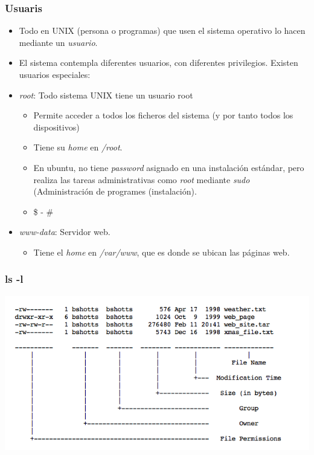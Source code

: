 \documentclass[colorlinks,10pt]{beamer}
\begin{document}
\begin{frame}
  \frametitle{Usuaris}
  \begin{itemize}
  \item<+-> Todo en UNIX (persona o programas) que usen el sistema operativo lo hacen mediante un \emph{usuario}.
  \item<+-> El sistema contempla diferentes usuarios, con diferentes privilegios. Existen usuarios especiales:
  \item<+-> \emph{root}: Todo  sistema UNIX tiene un usuario root
    \begin{itemize}
    \item Permite acceder a todos los ficheros del sistema (y por tanto todos los dispositivos)
    \item Tiene su \emph{home} en \emph{/root}.
    \item En ubuntu, no tiene \emph{password} asignado en una instalación estándar, pero realiza las tareas administrativas como 
      \emph{root} mediante \emph{sudo} (Administración de programes (instalación).
    \item \$ - \#
    \end{itemize}
\item<+-> \emph{www-data}: Servidor 
  web.
  \begin{itemize}
  \item Tiene el  \emph{home} en  \emph{/var/www}, que es donde se ubican las páginas web.
  \end{itemize}
  \end{itemize}
\end{frame}



\begin{frame}
  \frametitle{ ls -l}
    \begin{center}
    \includegraphics[width=1\textwidth]{figs/lsl} 
  \end{center} 
\end{frame}
\end{document}
